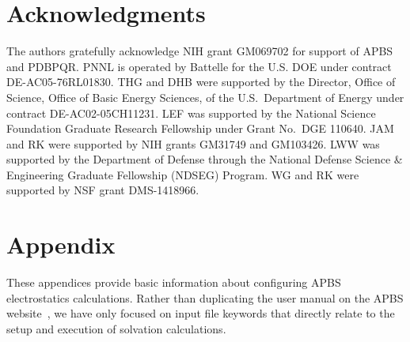 \documentclass[12pt,titlepage]{article}
\begin{document}
\section*{Acknowledgments}
The authors gratefully acknowledge NIH grant GM069702 for support of APBS and PDB\-PQR.
PNNL is operated by Battelle for the U.S. DOE under contract DE-AC05-76RL01830.  
THG and DHB were supported by the Director, Office of Science, Office of Basic Energy Sciences, of the U.S.~Department of Energy under contract DE-AC02-05CH11231.
LEF was supported by the National Science Foundation Graduate Research Fellowship under Grant No.~DGE 110640.
JAM and RK were supported by NIH grants GM31749 and GM103426.
LWW was supported by the Department of Defense through the National Defense Science \& Engineering Graduate Fellowship (NDSEG) Program.
WG and RK were supported by NSF grant DMS-1418966.


\pagebreak
\appendix

\section{Appendix}
\renewcommand{\thefigure}{\thesection\arabic{figure}}
\setcounter{figure}{0}

These appendices provide basic information about configuring APBS electrostatics calculations. 
Rather than duplicating the user manual on the APBS website~\cite{APBSweb}, we have only focused on input file keywords that directly relate to the setup and execution of solvation calculations.
\end{document}
